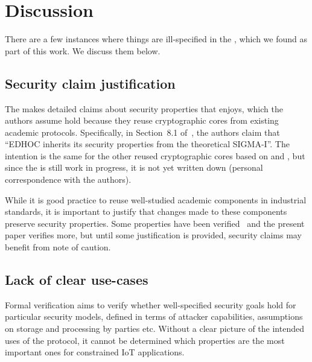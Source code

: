 \documentclass[runningheads, envcountsame, a4paper, draft, x11names]{llncs}
\newcommand{\spacehack}{\vspace{-1em}}
\newcommand{\fillhack}{\vspace{-0.5em}}
\begin{document}
\section{Discussion}
\label{sec:discussion}
\fillhack
{}
There are a few instances where things are ill-specified in the \mSpec{},
which we found as part of this work. We discuss them below.
%
\spacehack

\subsection{Security claim justification}
\label{sec:securityClaims}
\fillhack
The \mSpec{} makes detailed claims about security properties that \mEdhoc{}
enjoys, which the authors assume hold because they reuse cryptographic cores
from existing academic protocols.
%
Specifically, in Section~8.1 of~\cite{selander-lake-edhoc-01}, the authors
claim that ``EDHOC inherits its security properties from the theoretical
SIGMA-I''.
%
The intention is the same for the other reused cryptographic
cores based on \mOptls{} and \mNoise{}, but since the \mSpec{} is still work in
progress, it is not yet written down (personal correspondence with the authors).
%

While it is good practice to reuse well-studied academic components in
industrial standards, it is important to justify that changes made to these
components preserve security properties.
%
Some properties have been verified~\cite{DBLP:conf/secsr/BruniJPS18} and the
present paper verifies more, but until some justification is provided, security
claims may benefit from note of caution.
\spacehack
{}

\subsection{Lack of clear use-cases}
\label{sec:unclearProtocolUse}
\fillhack
Formal verification aims to verify whether well-specified security goals hold
for particular security models, defined in terms of attacker capabilities,
assumptions on storage and processing by parties etc.
%
Without a clear picture of the intended uses of the protocol, it cannot be
determined which properties are the most important ones for constrained IoT
applications.
%
\end{document}
